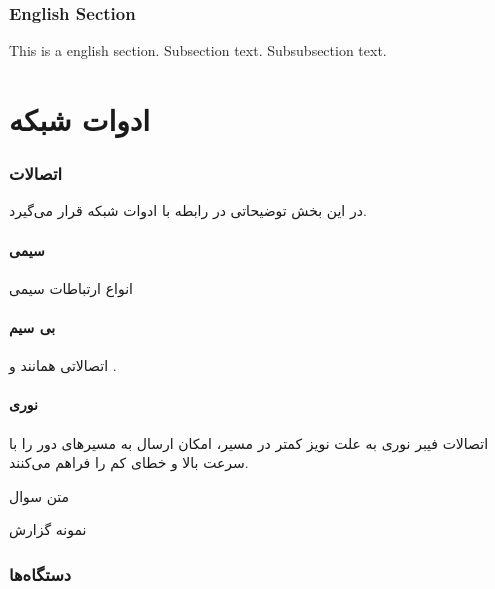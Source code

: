 \documentclass{../UTNetLabFa}
\begin{document}
\begin{otherlanguage}{english}
	\section{English Section}
	This is a english section.%
	Subsection text.
	Subsubsection text.
\end{otherlanguage}

\part{ادوات شبکه}
\section{اتصالات}
در این بخش توضیحاتی در رابطه با ادوات شبکه قرار می‌گیرد.
\subsection{سیمی}
انواع ارتباطات سیمی

\subsection{بی سیم}
اتصالاتی همانند  و .
\subsection{نوری}
اتصالات فیبر نوری به علت نویز کمتر در مسیر، امکان ارسال به مسیرهای دور را با سرعت بالا و خطای کم را فراهم می‌کنند.
\begin{question}
	\item متن سوال
\end{question}

\begin{report}
	\item نمونه گزارش
\end{report}

\section{دستگاه‌ها}
\end{document}
